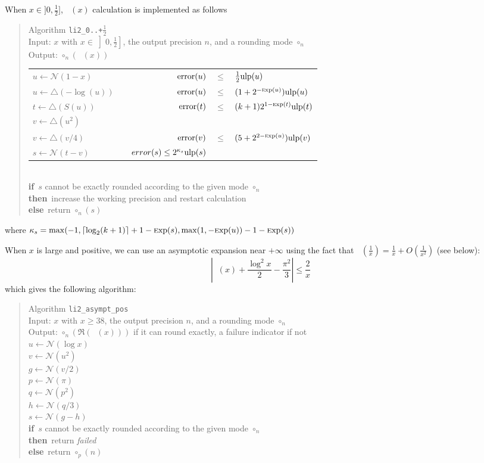 \documentclass[12pt]{amsart}
\DeclareMathOperator{\LiTwo}{Li_2}
\def\n{\textnormal}
\def\pinf{\bigtriangleup}
\def\ulp{{\rm ulp}}
\def\Exp{{\rm \textsc exp}}
\def\N{{\mathcal N}}
\def\If{{\bf if}}
\def\then{{\bf then}}
\def\Else{{\bf else}}
\begin{document}
When $x \in ]0, \frac{1}{2}]$, $\LiTwo(x)$ calculation is implemented as follows
\begin{quote}
Algorithm {\tt li2\_0..+$\frac{1}{2}$}\\
Input: $x$ with $x \in \left]0, \frac{1}{2}\right]$, the output precision
$n$, and a rounding mode $\circ_n$ \\
Output: $\circ_n(\LiTwo(x))$ \\
\begin{tabular}{l c r c l}
$u \leftarrow \N(1-x)$ & &
$\n{error}(u) $ & $ \leq $ & $ \frac{1}{2} \ulp(u)$\\
$u \leftarrow \pinf(-\log(u))$ & &
$\n{error}(u) $ & $ \leq $ & $ (1 + 2^{-\Exp(u)}) \ulp(u)$\\
$t \leftarrow \pinf(S(u))$ & &
$\n{error}(t) $ & $ \leq $ & $ (k+1) 2^{1-\Exp(t)} \ulp(t)$\\
$v \leftarrow \pinf(u^2)$\\
$v \leftarrow \pinf(v / 4)$ & &
$\n{error}(v) $ & $ \leq $ & $ (5 + 2^{2-\Exp(u)}) \ulp(v)$\\
$s \leftarrow \N(t - v)$ & & $error(s) \leq 2^{\kappa_s} \ulp(s)$\\
\end{tabular}\\
\If\ $s$ cannot be exactly rounded according to the given mode $\circ_n$\\
\then\ increase the working precision and restart calculation\\
\Else\ return $\circ_n(s)$
\end{quote}
where $\kappa_s ={\rm max}(-1, \lceil\log_2(k+1)\rceil + 1 - \Exp(s),
{\rm max}(1, -\Exp(u)) -1 - \Exp(s))$


When $x$ is large and positive, we can use an asymptotic expansion near
$+\infty$ using the fact that 
$\LiTwo\left(\frac{1}{x}\right) = \frac{1}{x} + O\left(\frac{1}{x^2}\right)$
(see below):
\[
\left|\LiTwo(x) + \frac{\log^2x}{2} - \frac{\pi^2}{3}\right| \leq \frac{2}{x}
\]
which gives the following algorithm:
\begin{quote}
Algorithm {\tt li2\_asympt\_pos}\\
Input: $x$ with $x \geq 38$, the output precision $n$, and a rounding mode
$\circ_n$ \\
Output: $\circ_n(\Re(\LiTwo(x)))$ if it can round exactly, a failure indicator
if not\\
$u \leftarrow \N(\log x)$\\
$v \leftarrow \N(u^2)$\\
$g \leftarrow \N(v/2)$\\
$p \leftarrow \N(\pi)$\\
$q \leftarrow \N(p^2)$\\
$h \leftarrow \N(q/3)$\\
$s \leftarrow \N(g-h)$\\
\If\ $s$ cannot be exactly rounded according to the given mode $\circ_n$\\
\then\ return {\em failed}\\
\Else\ return $\circ_p(n)$
\end{quote} 
\end{document}
